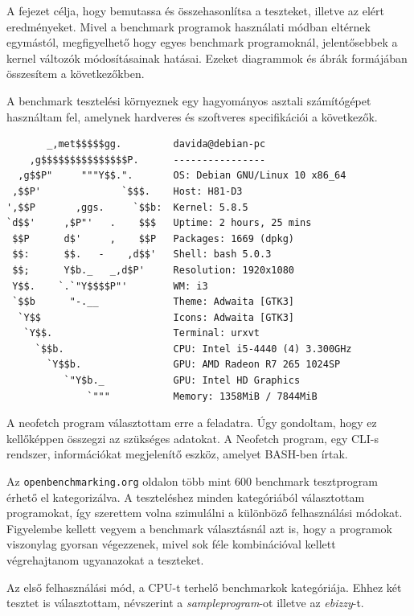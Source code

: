 
A fejezet célja, hogy bemutassa és összehasonlítsa a teszteket, illetve az elért eredményeket. Mivel a benchmark programok használati módban eltérnek egymástól, megfigyelhető hogy egyes benchmark programoknál, jelentősebbek a kernel változók módosításainak hatásai.
Ezeket diagrammok és ábrák formájában összesítem a következőkben.

A benchmark tesztelési környeznek egy hagyományos asztali számítógépet használtam fel, amelynek hardveres és szoftveres specifikációi a következők.

\begin{lstlisting}
       _,met$$$$$gg.         davida@debian-pc 
    ,g$$$$$$$$$$$$$$$P.      ---------------- 
  ,g$$P"     """Y$$.".       OS: Debian GNU/Linux 10 x86_64 
 ,$$P'              `$$$.    Host: H81-D3 
',$$P       ,ggs.     `$$b:  Kernel: 5.8.5 
`d$$'     ,$P"'   .    $$$   Uptime: 2 hours, 25 mins 
 $$P      d$'     ,    $$P   Packages: 1669 (dpkg) 
 $$:      $$.   -    ,d$$'   Shell: bash 5.0.3 
 $$;      Y$b._   _,d$P'     Resolution: 1920x1080 
 Y$$.    `.`"Y$$$$P"'        WM: i3 
 `$$b      "-.__             Theme: Adwaita [GTK3] 
  `Y$$                       Icons: Adwaita [GTK3] 
   `Y$$.                     Terminal: urxvt 
     `$$b.                   CPU: Intel i5-4440 (4) 3.300GHz 
       `Y$$b.                GPU: AMD Radeon R7 265 1024SP 
          `"Y$b._            GPU: Intel HD Graphics 
              `"""           Memory: 1358MiB / 7844MiB
\end{lstlisting}
A neofetch program választottam erre a feladatra. Úgy gondoltam, hogy ez kellőképpen összegzi az szükséges adatokat. A Neofetch program, egy CLI-s rendszer, információkat megjelenítő eszköz, amelyet BASH-ben írtak.


Az \texttt{openbenchmarking.org} oldalon több mint 600 benchmark tesztprogram érhető el kategorizálva. A teszteléshez minden kategóriából választottam programokat, így szerettem volna szimulálni a különböző felhasználási módokat. Figyelembe kellett vegyem a benchmark választásnál azt is, hogy a programok viszonylag gyorsan végezzenek, mivel sok féle kombinációval kellett végrehajtanom ugyanazokat a teszteket. 


Az első felhasználási mód, a CPU-t terhelő benchmarkok kategóriája. Ehhez két tesztet is választottam, névszerint a \textit{sampleprogram}-ot illetve az \textit{ebizzy}-t.

